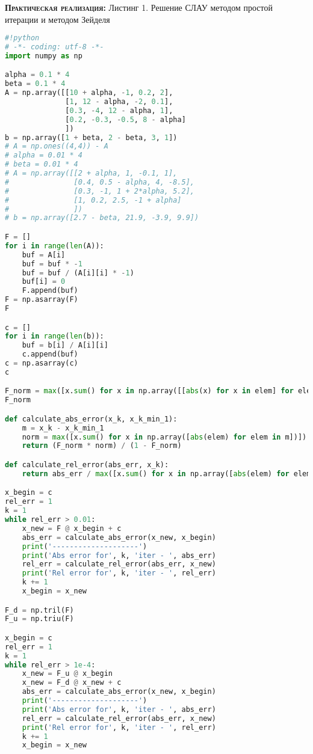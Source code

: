 \documentclass [12pt]{article}
\begin{document}
\textsc{\textbf{Практическая реализация:}}
Листинг 1. Решение СЛАУ методом простой итерации и методом Зейделя
\begin{lstlisting}[language=python]
#!python
# -*- coding: utf-8 -*-
import numpy as np

alpha = 0.1 * 4
beta = 0.1 * 4
A = np.array([[10 + alpha, -1, 0.2, 2],
              [1, 12 - alpha, -2, 0.1],
              [0.3, -4, 12 - alpha, 1],
              [0.2, -0.3, -0.5, 8 - alpha]
              ])
b = np.array([1 + beta, 2 - beta, 3, 1])
# A = np.ones((4,4)) - A
# alpha = 0.01 * 4
# beta = 0.01 * 4
# A = np.array([[2 + alpha, 1, -0.1, 1],
#               [0.4, 0.5 - alpha, 4, -8.5],
#               [0.3, -1, 1 + 2*alpha, 5.2],
#               [1, 0.2, 2.5, -1 + alpha]
#               ])
# b = np.array([2.7 - beta, 21.9, -3.9, 9.9])

F = []
for i in range(len(A)):
    buf = A[i]
    buf = buf * -1
    buf = buf / (A[i][i] * -1)
    buf[i] = 0
    F.append(buf)
F = np.asarray(F)
F

c = []
for i in range(len(b)):
    buf = b[i] / A[i][i]
    c.append(buf)
c = np.asarray(c)
c

F_norm = max([x.sum() for x in np.array([[abs(x) for x in elem] for elem in F])])
F_norm

def calculate_abs_error(x_k, x_k_min_1):
    m = x_k - x_k_min_1
    norm = max([x.sum() for x in np.array([abs(elem) for elem in m])])
    return (F_norm * norm) / (1 - F_norm)

def calculate_rel_error(abs_err, x_k):
    return abs_err / max([x.sum() for x in np.array([abs(elem) for elem in x_k])])

x_begin = c 
rel_err = 1
k = 1
while rel_err > 0.01:
    x_new = F @ x_begin + c
    abs_err = calculate_abs_error(x_new, x_begin)
    print('--------------------')
    print('Abs error for', k, 'iter - ', abs_err)
    rel_err = calculate_rel_error(abs_err, x_new)
    print('Rel error for', k, 'iter - ', rel_err)
    k += 1
    x_begin = x_new

F_d = np.tril(F)
F_u = np.triu(F)

x_begin = c 
rel_err = 1
k = 1
while rel_err > 1e-4:
    x_new = F_u @ x_begin
    x_new = F_d @ x_new + c
    abs_err = calculate_abs_error(x_new, x_begin)
    print('--------------------')
    print('Abs error for', k, 'iter - ', abs_err)
    rel_err = calculate_rel_error(abs_err, x_new)
    print('Rel error for', k, 'iter - ', rel_err)
    k += 1
    x_begin = x_new

\end{lstlisting}
\end{document}
